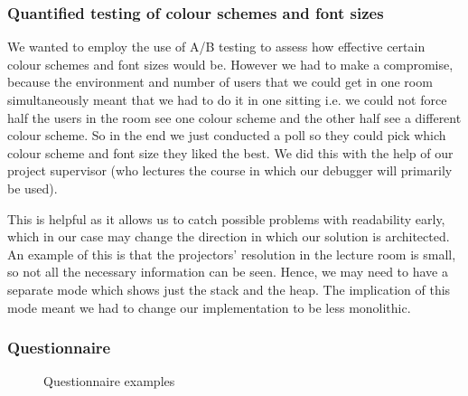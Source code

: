 \documentclass[11pt, a4paper]{article}
\begin{document}
\subsubsection{Quantified testing of colour schemes and font sizes}
We wanted to employ the use of A/B testing to assess how effective certain colour schemes and font sizes would be.
However we had to make a compromise, because the environment and number of users that we could get in one room simultaneously meant that we had to do it in one sitting i.e. we could not force half the users in the room see one colour scheme and the other half see a different colour scheme.
So in the end we just conducted a poll so they could pick which colour scheme and font size they liked the best.
We did this with the help of our project supervisor (who lectures the course in which our debugger will primarily be used). 

This is helpful as it allows us to catch possible problems with readability early, which in our case may change the direction in which our solution is architected.
An example of this is that the projectors’ resolution in the lecture room is small, so not all the necessary information can be seen.
Hence, we may need to have a separate mode which shows just the stack and the heap.
The implication of this mode meant we had to change our implementation to be less monolithic.

\subsubsection{Questionnaire}
\begin{figure}[h!]
\centering
{}
\quad
{}
\caption{Questionnaire examples}
\end{figure}
\end{document}
